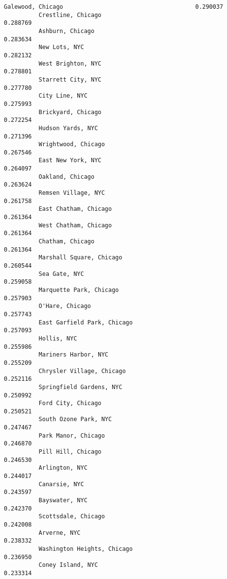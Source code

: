 \documentclass[11pt]{article}
\begin{document}
\begin{Verbatim}[commandchars=\\\{\}]
          Galewood, Chicago                                      0.290037
          Crestline, Chicago                                     0.288769
          Ashburn, Chicago                                       0.283634
          New Lots, NYC                                          0.282132
          West Brighton, NYC                                     0.278801
          Starrett City, NYC                                     0.277780
          City Line, NYC                                         0.275993
          Brickyard, Chicago                                     0.272254
          Hudson Yards, NYC                                      0.271396
          Wrightwood, Chicago                                    0.267546
          East New York, NYC                                     0.264097
          Oakland, Chicago                                       0.263624
          Remsen Village, NYC                                    0.261758
          East Chatham, Chicago                                  0.261364
          West Chatham, Chicago                                  0.261364
          Chatham, Chicago                                       0.261364
          Marshall Square, Chicago                               0.260544
          Sea Gate, NYC                                          0.259058
          Marquette Park, Chicago                                0.257903
          O'Hare, Chicago                                        0.257743
          East Garfield Park, Chicago                            0.257093
          Hollis, NYC                                            0.255986
          Mariners Harbor, NYC                                   0.255209
          Chrysler Village, Chicago                              0.252116
          Springfield Gardens, NYC                               0.250992
          Ford City, Chicago                                     0.250521
          South Ozone Park, NYC                                  0.247467
          Park Manor, Chicago                                    0.246870
          Pill Hill, Chicago                                     0.246530
          Arlington, NYC                                         0.244017
          Canarsie, NYC                                          0.243597
          Bayswater, NYC                                         0.242370
          Scottsdale, Chicago                                    0.242008
          Arverne, NYC                                           0.238332
          Washington Heights, Chicago                            0.236950
          Coney Island, NYC                                      0.233314

\end{Verbatim}
\end{document}
